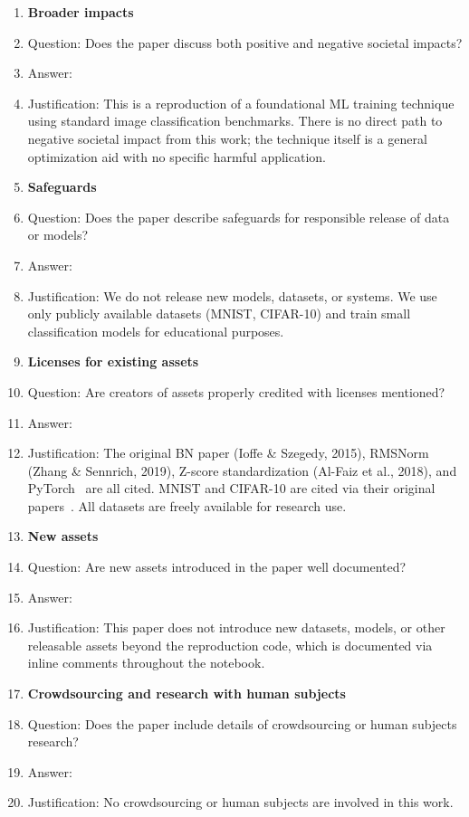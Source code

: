 \documentclass{article}
\begin{document}
\begin{enumerate}
\item \textbf{Broader impacts}
  \item[] Question: Does the paper discuss both positive and negative societal impacts?
  \item[] Answer: \answerNA{}
  \item[] Justification: This is a reproduction of a foundational ML training technique using
  standard image classification benchmarks. There is no direct path to negative societal
  impact from this work; the technique itself is a general optimization aid with no specific
  harmful application.

\item \textbf{Safeguards}
  \item[] Question: Does the paper describe safeguards for responsible release of data or models?
  \item[] Answer: \answerNA{}
  \item[] Justification: We do not release new models, datasets, or systems. We use only
  publicly available datasets (MNIST, CIFAR-10) and train small classification models for
  educational purposes.

\item \textbf{Licenses for existing assets}
  \item[] Question: Are creators of assets properly credited with licenses mentioned?
  \item[] Answer: \answerYes{}
  \item[] Justification: The original BN paper (Ioffe \& Szegedy, 2015), RMSNorm
  (Zhang \& Sennrich, 2019), Z-score standardization (Al-Faiz et al., 2018), and
  PyTorch~\cite{paszke2019pytorch} are all cited. MNIST and CIFAR-10 are cited via their
  original papers~\cite{lecun1998,krizhevsky2009}. All datasets are freely available for
  research use.

\item \textbf{New assets}
  \item[] Question: Are new assets introduced in the paper well documented?
  \item[] Answer: \answerNA{}
  \item[] Justification: This paper does not introduce new datasets, models, or other releasable
  assets beyond the reproduction code, which is documented via inline comments throughout the
  notebook.

\item \textbf{Crowdsourcing and research with human subjects}
  \item[] Question: Does the paper include details of crowdsourcing or human subjects research?
  \item[] Answer: \answerNA{}
  \item[] Justification: No crowdsourcing or human subjects are involved in this work.


\end{enumerate}
\end{document}
